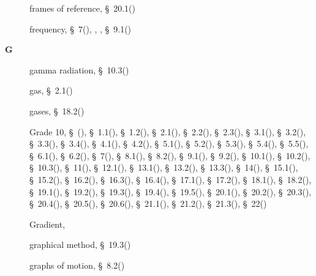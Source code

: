 \begin{multicols}{2}
{\begin{description}
	  \item[] \noindent\raggedright frames of reference,  \S~20.1(\pageref{m38787})
	  \item[] \noindent\raggedright frequency,  \S~7(\pageref{m38806}),  \pageref{id2440655},  \pageref{id2445977},  \S~9.1(\pageref{m38799})
	  \vspace{.3cm}
	  \item[{\large \bfseries G}]\noindent\raggedright
	  gamma radiation,  \S~10.3(\pageref{m38779})
	  \item[] \noindent\raggedright gas,  \S~2.1(\pageref{m38736})
	  \item[] \noindent\raggedright gases,  \S~18.2(\pageref{m38712})
	  \item[] \noindent\raggedright Grade 10,  \S~(\pageref{m30853}),  \S~1.1(\pageref{m38708}),  \S~1.2(\pageref{m38706}),  \S~2.1(\pageref{m38736}),  \S~2.2(\pageref{m38734}),  \S~2.3(\pageref{m38730}),  \S~3.1(\pageref{m38756}),  \S~3.2(\pageref{m38745}),  \S~3.3(\pageref{m38753}),  \S~3.4(\pageref{m38741}),  \S~4.1(\pageref{m38760}),  \S~4.2(\pageref{m38757}),  \S~5.1(\pageref{m38704}),  \S~5.2(\pageref{m38701}),  \S~5.3(\pageref{m38684}),  \S~5.4(\pageref{m38694}),  \S~5.5(\pageref{m38689}),  \S~6.1(\pageref{m38801}),  \S~6.2(\pageref{m38802}),  \S~7(\pageref{m38806}),  \S~8.1(\pageref{m38782}),  \S~8.2(\pageref{m38783}),  \S~9.1(\pageref{m38799}),  \S~9.2(\pageref{m38800}),  \S~10.1(\pageref{m38777}),  \S~10.2(\pageref{m38778}),  \S~10.3(\pageref{m38779}),  \S~11(\pageref{m38120}),  \S~12.1(\pageref{m38709}),  \S~13.1(\pageref{m38721}),  \S~13.2(\pageref{m38726}),  \S~13.3(\pageref{m38727}),  \S~14(\pageref{m37830}),  \S~15.1(\pageref{m38780}),  \S~15.2(\pageref{m38781}),  \S~16.2(\pageref{m38772}),  \S~16.3(\pageref{m38773}),  \S~16.4(\pageref{m38776}),  \S~17.1(\pageref{m38720}),  \S~17.2(\pageref{m38719}),  \S~18.1(\pageref{m38717}),  \S~18.2(\pageref{m38712}),  \S~19.1(\pageref{m38812}),  \S~19.2(\pageref{m38813}),  \S~19.3(\pageref{m38815}),  \S~19.4(\pageref{m38816}),  \S~19.5(\pageref{m38819}),  \S~20.1(\pageref{m38787}),  \S~20.2(\pageref{m38788}),  \S~20.3(\pageref{m38791}),  \S~20.4(\pageref{m38794}),  \S~20.5(\pageref{m38795}),  \S~20.6(\pageref{m38796}),  \S~21.1(\pageref{m38784}),  \S~21.2(\pageref{m38785}),  \S~21.3(\pageref{m38786}),  \S~22(\pageref{m38138})
	  \item[] \noindent\raggedright Gradient,  \pageref{id2533985}
	  \item[] \noindent\raggedright graphical method,  \S~19.3(\pageref{m38815})
	  \item[] \noindent\raggedright graphs of motion,  \S~8.2(\pageref{m38783})

\end{description}}
\end{multicols}
